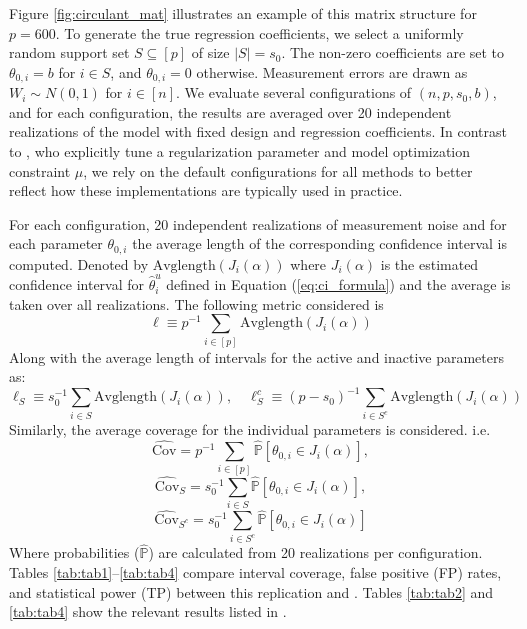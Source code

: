 \documentclass{article}
\begin{document}
Figure \ref{fig:circulant_mat} illustrates an example of this matrix structure for $p=600$. To generate the true regression coefficients, we select a uniformly random support set $S \subseteq [p]$ of size $|S|=s_0$. The non-zero coefficients are set to $\theta_{0,i}=b$ for $i \in S$, and $\theta_{0,i}=0$ otherwise. Measurement errors are drawn as $W_i \sim N(0,1)$ for $i \in [n]$. We evaluate several configurations of $(n, p, s_0, b)$, and for each configuration, the results are averaged over 20 independent realizations of the model with fixed design and regression coefficients. In contrast to \citet{javanmard14a}, who explicitly tune a regularization parameter and model optimization constraint $\mu$, we rely on the default configurations for all methods to better reflect how these implementations are typically used in practice.

For each configuration, 20 independent realizations of measurement noise and for each parameter $\theta_{0,i}$ the average length of the corresponding confidence interval is computed. Denoted by $\text{Avglength}(J_i(\alpha))$ where $J_i(\alpha)$ is the estimated confidence interval for $\hat{\theta}_i^u$ defined in Equation (\ref{eq:ci_formula}) and the average is taken over all realizations. The following metric considered is
$$
\ell \equiv p^{-1} \sum_{i \in [p]} \text{Avglength}(J_i(\alpha))
$$
Along with the average length of intervals for the active and inactive parameters as:
\begin{equation}
    \ell_S \equiv s_0^{-1} \sum_{i \in S}\text{Avglength}(J_i(\alpha)), \quad \ell_S^c \equiv (p-s_0)^{-1}\sum_{i \in S^c}\text{Avglength}(J_i(\alpha))
\end{equation}
Similarly, the average coverage for the individual parameters is considered. i.e.
\begin{equation}
\widehat{\text{Cov}} = p^{-1}\sum_{i \in [p]}\widehat{\mathbb{P}}[ \theta_{0,i}\in J_i(\alpha)],    
\end{equation}
\begin{equation}
\widehat{\text{Cov}}_S = s_0^{-1}\sum_{i \in S}\widehat{\mathbb{P}}[ \theta_{0,i}\in J_i(\alpha)],
\end{equation}
\begin{equation}
\widehat{\text{Cov}}_{S^c} = s_0^{-1}\sum_{i \in S^c}\widehat{\mathbb{P}}[ \theta_{0,i}\in J_i(\alpha)]
\end{equation}
Where probabilities ($\widehat{\mathbb{P}}$) are calculated from 20 realizations per configuration. Tables \ref{tab:tab1}--\ref{tab:tab4} compare interval coverage, false positive (FP) rates, and statistical power (TP) between this replication and \citet{javanmard14a}. Tables \ref{tab:tab2} and \ref{tab:tab4} show the relevant results listed in \citet{javanmard14a}.
\end{document}
